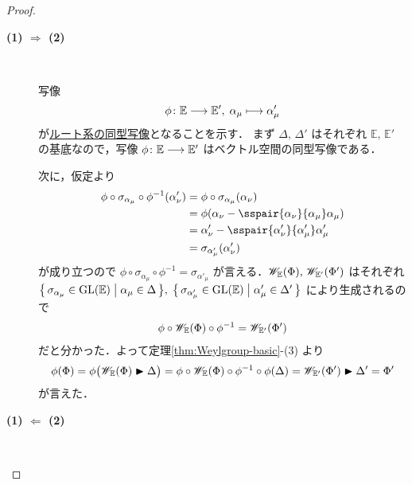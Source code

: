 \documentclass[rep_main]{subfiles}
\begin{document}
\begin{proof}
	\begin{description}
		\item[\textbf{(1) $\bm{\Longrightarrow}$ (2)}]　
		
		写像
		\begin{align}
			\phi \colon \mathbb{E} \longrightarrow \mathbb{E}',\; \alpha_\mu \longmapsto \alpha_\mu'
		\end{align}
		が\hyperref[def:isom-root]{ルート系の同型写像}となることを示す．
		まず $\Delta,\, \Delta'$ はそれぞれ $\mathbb{E},\, \mathbb{E}'$ の基底なので，写像 $\phi \colon \mathbb{E} \longrightarrow \mathbb{E}'$ はベクトル空間の同型写像である．

		次に，仮定より
		\begin{align}
			\phi \circ \sigma_{\alpha_\mu} \circ \phi^{-1}(\alpha'_\nu)
			&=  \phi \circ \sigma_{\alpha_\mu}(\alpha_\nu) \\
			&= \phi (\alpha_\nu - \sspair{\alpha_\nu}{\alpha_\mu} \alpha_\mu) \\
			&= \alpha'_\nu - \sspair{\alpha'_\nu}{\alpha'_\mu} \alpha'_\mu \\
			&= \sigma_{\alpha'_\mu}(\alpha'_\nu)
		\end{align}
		が成り立つので $\phi \circ \sigma_{\alpha_\mu} \circ \phi^{-1} = \sigma_{\alpha'_\mu}$ が言える．$\mathscr{W}_{\mathbb{E}}(\Phi),\, \mathscr{W}_{\mathbb{E}'}(\Phi')$ はそれぞれ $\bigl\{\, \sigma_{\alpha_\mu} \in \mathrm{GL}(\mathbb{E}) \bigm| \alpha_\mu \in \Delta \,\bigr\},\; \bigl\{\, \sigma_{\alpha'_\mu} \in \mathrm{GL}(\mathbb{E}) \bigm| \alpha'_\mu \in \Delta' \,\bigr\} $ により生成されるので
		\begin{align}
			\phi \circ \mathscr{W}_{\mathbb{E}}(\Phi) \circ \phi^{-1} = \mathscr{W}_{\mathbb{E}'}(\Phi')
		\end{align}
		だと分かった．よって定理\ref{thm:Weylgroup-basic}-(3) より
		\begin{align}
			\phi(\Phi) = \phi \bigl( \mathscr{W}_{\mathbb{E}}(\Phi) \blacktriangleright \Delta  \bigr) = \phi \circ \mathscr{W}_{\mathbb{E}}(\Phi) \circ \phi^{-1} \circ \phi(\Delta) = \mathscr{W}_{\mathbb{E}'}(\Phi') \blacktriangleright \Delta' = \Phi'
		\end{align}
		が言えた．

		\item[\textbf{(1) $\bm{\Longleftarrow}$ (2)}]　
		

\end{description}
\end{proof}
\end{document}
